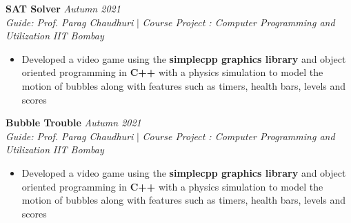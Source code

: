\documentclass[a4paper,10pt]{article}
\begin{document}
\vspace{\baselineskip}
\vspace{-15pt}
\noindent\textbf{\large SAT Solver} \hfill{\sl \small Autumn 2021}\\
{\it Guide: Prof. Parag Chaudhuri} $|$ {\it Course Project : Computer Programming and Utilization } \hfill{\it IIT Bombay}
\vspace{-2pt}
\begin{itemize}[itemsep = -0.65 mm, leftmargin=*]
    \item Developed a video game using the \textbf{simplecpp graphics library} and object oriented programming in \textbf{C++} with a
          physics simulation to model the motion of bubbles along with features such as timers, health bars, levels and scores
\end{itemize}
\vspace{\baselineskip}
\vspace{-15pt}
\noindent\textbf{\large Bubble Trouble} \hfill{\sl \small Autumn 2021}\\
{\it Guide: Prof. Parag Chaudhuri} $|$ {\it Course Project : Computer Programming and Utilization } \hfill{\it IIT Bombay}
\vspace{-2pt}
\begin{itemize}[itemsep = -0.65 mm, leftmargin=*]
    \item Developed a video game using the \textbf{simplecpp graphics library} and object oriented programming in \textbf{C++} with a
          physics simulation to model the motion of bubbles along with features such as timers, health bars, levels and scores
\end{itemize}
\end{document}
